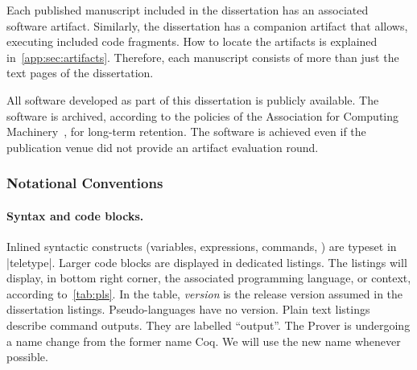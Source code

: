 Each published manuscript included in the dissertation has an associated software artifact.
Similarly, the dissertation has a companion artifact that allows, \eg executing included code fragments.
How to locate the artifacts is explained in~\autoref{app:sec:artifacts}.
Therefore, each manuscript consists of more than just the text pages of the dissertation.

All software developed as part of this dissertation is publicly available.
The software is archived, according to the policies of the Association for Computing Machinery~\cite{acm_badging}, for long-term retention.
The software is achieved even if the publication venue did not provide an artifact evaluation round.

\subsubsection{Notational Conventions}

\paragraph*{Syntax and code blocks.}
Inlined syntactic constructs (variables, expressions, commands, \etc) are typeset in \pr|teletype|.
Larger code blocks are displayed in dedicated listings.
The listings will display, in bottom right corner, the associated programming language, or context, according to~\autoref{tab:pls}.
In the table, \emph{version} is the release version assumed in the dissertation listings.
Pseudo-languages have no version.
Plain text listings describe command outputs.
They are labelled \enquote{output}.
The  Prover is undergoing a name change from the former name Coq.
We will use the new name whenever possible.

